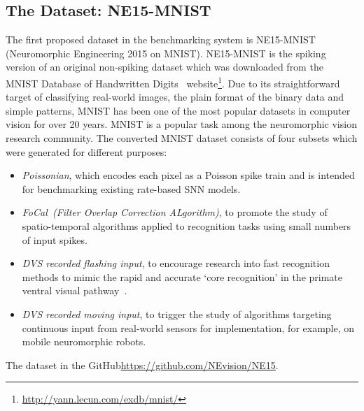 \subsection{The Dataset: NE15-MNIST}
\label{sec:data}
The first proposed dataset in the benchmarking system is NE15-MNIST (Neuromorphic Engineering 2015 on MNIST).
NE15-MNIST is the spiking version of an original non-spiking dataset which was downloaded from the MNIST Database of Handwritten Digits~\citep{lecun1998gradient}  website\footnote{\DIFdelbegin {}\DIFdelend \DIFaddbegin \url{http://yann.lecun.com/exdb/mnist/}\DIFaddend }.
Due to its straightforward target of classifying real-world images, the plain format of the binary data and simple patterns, MNIST has been one of the most popular datasets in computer vision for over 20 years.
MNIST is a popular task among the neuromorphic vision research community\DIFdelbegin {}\DIFdelend .
The converted MNIST dataset consists of four subsets which were generated for different purposes:
\begin{itemize}
	\item \textit{Poissonian},
	which encodes each pixel as a Poisson spike train and is intended for benchmarking existing rate-based SNN models.
	\item \textit{FoCal~(Filter Overlap Correction ALgorithm)},
	to promote the study of spatio-temporal algorithms applied to recognition tasks using small numbers of input spikes.
	\item \textit{DVS recorded flashing input},
	to encourage research into fast recognition methods to mimic the rapid and accurate `core recognition' in the primate ventral visual pathway~\citep{dicarlo2012does}.
	\item \textit{DVS recorded moving input},
	to trigger the study of algorithms targeting continuous input from real-world sensors for implementation, for example, on mobile neuromorphic robots.
\end{itemize}
The dataset \DIFdelbegin {}\DIFdelend \DIFaddbegin {}\DIFaddend in the GitHub\DIFdelbegin {}\DIFdelend \DIFaddbegin \DIFadd{: }\url{https://github.com/NEvision/NE15}\DIFaddend .
